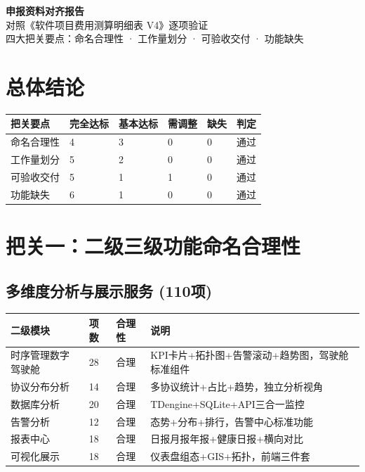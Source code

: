 \documentclass[11pt,a4paper]{ctexart}
\begin{document}
\begin{center}
{\Huge\bfseries\color{pri}申报资料对齐报告}\\[6pt]
{\large 对照《软件项目费用测算明细表 V4》逐项验证}\\[4pt]
{\normalsize 四大把关要点：命名合理性 · 工作量划分 · 可验收交付 · 功能缺失}
\end{center}
\vspace{1em}\hrulefill\vspace{1em}

\section{总体结论}

\begin{table}[H]\centering
\begin{tabular}{p{3cm}p{1.5cm}p{1.5cm}p{1.5cm}p{1.5cm}p{1.5cm}}
\toprule
\textbf{把关要点} & \textbf{完全达标} & \textbf{基本达标} & \textbf{需调整} & \textbf{缺失} & \textbf{判定} \\
\midrule
命名合理性 & 4 & 3 & 0 & 0 & \color{ok}通过 \\
工作量划分 & 5 & 2 & 0 & 0 & \color{ok}通过 \\
可验收交付 & 5 & 1 & 1 & 0 & \color{ok}通过 \\
功能缺失 & 6 & 1 & 0 & 0 & \color{ok}通过 \\
\bottomrule
\end{tabular}
\end{table}

\section{把关一：二级三级功能命名合理性}

\subsection{多维度分析与展示服务 (110项)}

\begin{longtable}{p{3.5cm}p{2.5cm}p{2cm}p{4.5cm}}
\toprule\textbf{二级模块} & \textbf{项数} & \textbf{合理性} & \textbf{说明}\\\midrule
时序管理数字驾驶舱 & 28 & \color{ok}合理 & KPI卡片+拓扑图+告警滚动+趋势图，驾驶舱标准组件 \\
协议分布分析 & 14 & \color{ok}合理 & 多协议统计+占比+趋势，独立分析视角 \\
数据库分析 & 20 & \color{ok}合理 & TDengine+SQLite+API三合一监控 \\
告警分析 & 12 & \color{ok}合理 & 态势+分布+排行，告警中心标准功能 \\
报表中心 & 18 & \color{ok}合理 & 日报月报年报+健康日报+横向对比 \\
可视化展示 & 18 & \color{ok}合理 & 仪表盘组态+GIS+拓扑，前端三件套 \\\bottomrule
\end{longtable}
\end{document}
